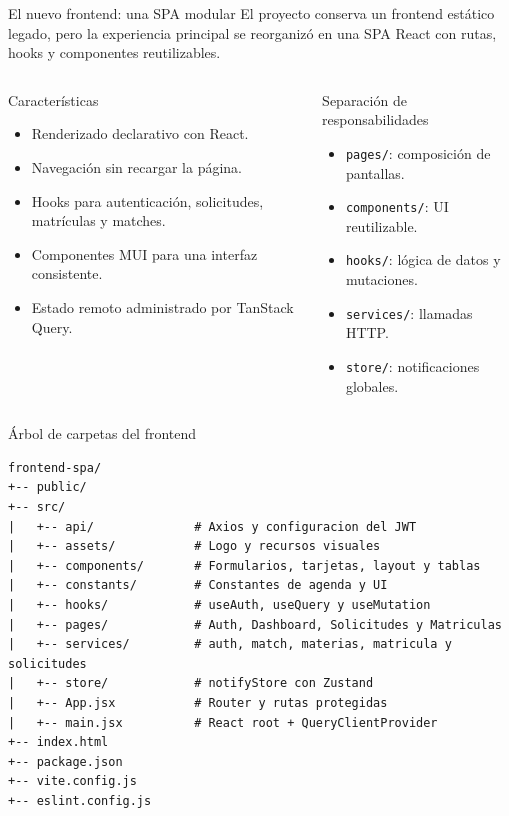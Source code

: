 \documentclass[aspectratio=169,11pt]{beamer}
\begin{document}
\begin{frame}{El nuevo frontend: una SPA modular}
  El proyecto conserva un frontend estático legado, pero la experiencia principal
  se reorganizó en una SPA React con rutas, hooks y componentes reutilizables.
  \vspace{0.25cm}
  \begin{columns}[T]
      \begin{block}{Características}
        \begin{itemize}
          \item Renderizado declarativo con React.
          \item Navegación sin recargar la página.
          \item Hooks para autenticación, solicitudes, matrículas y matches.
          \item Componentes MUI para una interfaz consistente.
          \item Estado remoto administrado por TanStack Query.
        \end{itemize}
      \end{block}
      \begin{block}{Separación de responsabilidades}
        \begin{itemize}
          \item \texttt{pages/}: composición de pantallas.
          \item \texttt{components/}: UI reutilizable.
          \item \texttt{hooks/}: lógica de datos y mutaciones.
          \item \texttt{services/}: llamadas HTTP.
          \item \texttt{store/}: notificaciones globales.
        \end{itemize}
      \end{block}
  \end{columns}
\end{frame}

\begin{frame}[fragile]{Árbol de carpetas del frontend}
\scriptsize
\begin{lstlisting}
frontend-spa/
+-- public/
+-- src/
|   +-- api/              # Axios y configuracion del JWT
|   +-- assets/           # Logo y recursos visuales
|   +-- components/       # Formularios, tarjetas, layout y tablas
|   +-- constants/        # Constantes de agenda y UI
|   +-- hooks/            # useAuth, useQuery y useMutation
|   +-- pages/            # Auth, Dashboard, Solicitudes y Matriculas
|   +-- services/         # auth, match, materias, matricula y solicitudes
|   +-- store/            # notifyStore con Zustand
|   +-- App.jsx           # Router y rutas protegidas
|   +-- main.jsx          # React root + QueryClientProvider
+-- index.html
+-- package.json
+-- vite.config.js
+-- eslint.config.js
\end{lstlisting}
\end{frame}
\end{document}
